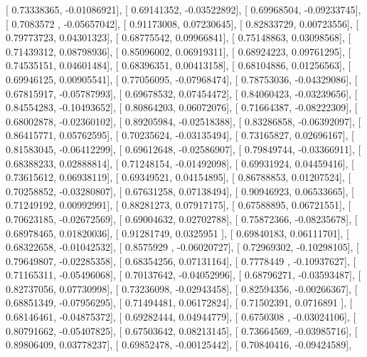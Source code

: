 \documentclass{article}
\begin{document}
       [ 0.73338365, -0.01086921],
       [ 0.69141352, -0.03522892],
       [ 0.69968504, -0.09233745],
       [ 0.7083572 , -0.05657042],
       [ 0.91173008,  0.07230645],
       [ 0.82833729,  0.00723556],
       [ 0.79773723,  0.04301323],
       [ 0.68775542,  0.09966841],
       [ 0.75148863,  0.03098568],
       [ 0.71439312,  0.08798936],
       [ 0.85096002,  0.06919311],
       [ 0.68924223,  0.09761295],
       [ 0.74535151,  0.04601484],
       [ 0.68396351,  0.00413158],
       [ 0.68104886,  0.01256563],
       [ 0.69946125,  0.00905541],
       [ 0.77056095, -0.07968474],
       [ 0.78753036, -0.04329086],
       [ 0.67815917, -0.05787993],
       [ 0.69678532,  0.07454472],
       [ 0.84060423, -0.03239656],
       [ 0.84554283, -0.10493652],
       [ 0.80864203,  0.06072076],
       [ 0.71664387, -0.08222309],
       [ 0.68002878, -0.02360102],
       [ 0.89205984, -0.02518388],
       [ 0.83286858, -0.06392097],
       [ 0.86415771,  0.05762595],
       [ 0.70235624, -0.03135494],
       [ 0.73165827,  0.02696167],
       [ 0.81583045, -0.06412299],
       [ 0.69612648, -0.02586907],
       [ 0.79849744, -0.03366911],
       [ 0.68388233,  0.02888814],
       [ 0.71248154, -0.01492098],
       [ 0.69931924,  0.04459416],
       [ 0.73615612,  0.06938119],
       [ 0.69349521,  0.04154895],
       [ 0.86788853,  0.01207524],
       [ 0.70258852, -0.03280807],
       [ 0.67631258,  0.07138494],
       [ 0.90946923,  0.06533665],
       [ 0.71249192,  0.00992991],
       [ 0.88281273,  0.07917175],
       [ 0.67588895,  0.06721551],
       [ 0.70623185, -0.02672569],
       [ 0.69004632,  0.02702788],
       [ 0.75872366, -0.08235678],
       [ 0.68978465,  0.01820036],
       [ 0.91281749,  0.0325951 ],
       [ 0.69840183,  0.06111701],
       [ 0.68322658, -0.01042532],
       [ 0.8575929 , -0.06020727],
       [ 0.72969302, -0.10298105],
       [ 0.79649807, -0.02285358],
       [ 0.68354256,  0.07131164],
       [ 0.7778449 , -0.10937627],
       [ 0.71165311, -0.05496068],
       [ 0.70137642, -0.04052996],
       [ 0.68796271, -0.03593487],
       [ 0.82737056,  0.07730998],
       [ 0.73236098, -0.02943458],
       [ 0.82594356, -0.00266367],
       [ 0.68851349, -0.07956295],
       [ 0.71494481,  0.06172824],
       [ 0.71502391,  0.0716891 ],
       [ 0.68146461, -0.04875372],
       [ 0.69282444,  0.04944779],
       [ 0.6750308 , -0.03024106],
       [ 0.80791662, -0.05407825],
       [ 0.67503642,  0.08213145],
       [ 0.73664569, -0.03985716],
       [ 0.89806409,  0.03778237],
       [ 0.69852478, -0.00125442],
       [ 0.70840416, -0.09424589],
\end{document}

